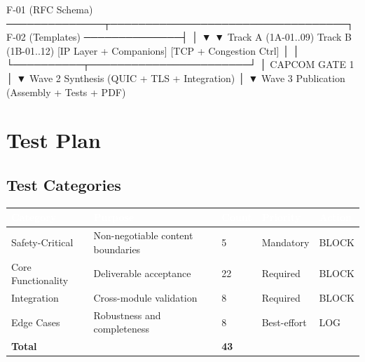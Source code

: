 \documentclass[11pt,letterpaper]{article}
\newcommand{\tableheader}[1]{\textbf{\sffamily\textcolor{white}{#1}}}
\begin{document}
\begin{asciibox}
F-01 (RFC Schema) ──────────────┬──────────────────────────────────┐
F-02 (Templates)  ──────────────┤                                  │
                                ▼                                  ▼
                      Track A (1A-01..09)            Track B (1B-01..12)
                      [IP Layer + Companions]         [TCP + Congestion Ctrl]
                                │                                  │
                                └──────────┬───────────────────────┘
                                           │
                                   CAPCOM GATE 1
                                           │
                                           ▼
                                   Wave 2 Synthesis
                                   (QUIC + TLS + Integration)
                                           │
                                           ▼
                                   Wave 3 Publication
                                   (Assembly + Tests + PDF)
\end{asciibox}

\section{Test Plan}

\subsection{Test Categories}

\begin{center}
\begin{tabularx}{\textwidth}{L{3cm}XC{1.8cm}C{2cm}C{1.5cm}}
\toprule
{}
\tableheader{Category} & \tableheader{Purpose} & \tableheader{Count} & \tableheader{Priority} & \tableheader{Action} \\
\midrule
Safety-Critical & Non-negotiable content boundaries & 5 & Mandatory & BLOCK \\
Core Functionality & Deliverable acceptance & 22 & Required & BLOCK \\
Integration & Cross-module validation & 8 & Required & BLOCK \\
Edge Cases & Robustness and completeness & 8 & Best-effort & LOG \\
\midrule
\textbf{Total} & & \textbf{43} & & \\
\bottomrule
\end{tabularx}
\end{center}
\end{document}
